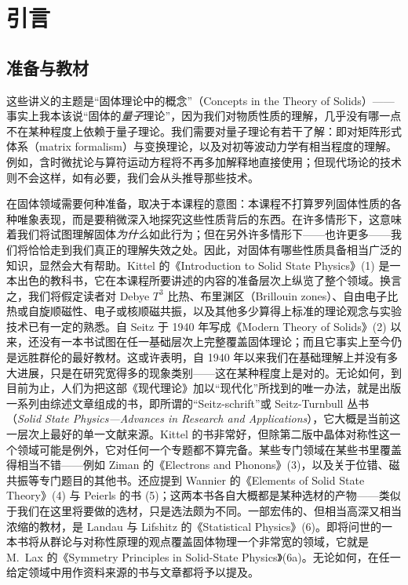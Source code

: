 \chapter{引言}

\section{准备与教材}

这些讲义的主题是“固体理论中的概念”（Concepts in the Theory of Solids）——事实上我本该说“固体的\emph{量子}理论”，因为我们对物质性质的理解，几乎没有哪一点不在某种程度上依赖于量子理论。我们需要对量子理论有若干了解：即对矩阵形式体系（matrix formalism）与变换理论，以及对初等波动力学有相当程度的理解。例如，含时微扰论与算符运动方程将不再多加解释地直接使用；但现代场论的技术则不会这样，如有必要，我们会从头推导那些技术。

在固体领域需要何种准备，取决于本课程的意图：本课程不打算罗列固体性质的各种唯象表现，而是要稍微深入地探究这些性质背后的东西。在许多情形下，这意味着我们将试图理解固体\emph{为什么}如此行为；但在另外许多情形下——也许更多——我们将恰恰走到我们真正的理解失效之处。因此，对固体有哪些性质具备相当广泛的知识，显然会大有帮助。Kittel 的《Introduction to Solid State Physics》(1) 是一本出色的教科书，它在本课程所要讲述的内容的准备层次上纵览了整个领域。换言之，我们将假定读者对 Debye $T^3$ 比热、布里渊区（Brillouin zones）、自由电子比热或自旋顺磁性、电子或核顺磁共振，以及其他多少算得上标准的理论观念与实验技术已有一定的熟悉。自 Seitz 于 1940 年写成《Modern Theory of Solids》(2) 以来，还没有一本书试图在任一基础层次上完整覆盖固体理论；而且它事实上至今仍是远胜群伦的最好教材。这或许表明，自 1940 年以来我们在基础理解上并没有多大进展，只是在研究宽得多的现象类别——这在某种程度上是对的。无论如何，到目前为止，人们为把这部《现代理论》加以“现代化”所找到的唯一办法，就是出版一系列由综述文章组成的书，即所谓的“Seitz-schrift”或 Seitz-Turnbull 丛书（\emph{Solid State Physics---Advances in Research and Applications}），它大概是当前这一层次上最好的单一文献来源。Kittel 的书非常好，但除第二版中晶体对称性这一个领域可能是例外，它对任何一个专题都不算完备。某些专门领域在某些书里覆盖得相当不错——例如 Ziman 的《Electrons and Phonons》(3)，以及关于位错、磁共振等专门题目的其他书。还应提到 Wannier 的《Elements of Solid State Theory》(4) 与 Peierls 的书 (5)；这两本书各自大概都是某种选材的产物——类似于我们在这里将要做的选材，只是选法颇为不同。一部宏伟的、但相当高深又相当浓缩的教材，是 Landau 与 Lifshitz 的《Statistical Physics》(6)。即将问世的一本书将从群论与对称性原理的观点覆盖固体物理一个非常宽的领域，它就是 M.~Lax 的《Symmetry Principles in Solid-State Physics》(6a)。无论如何，在任一给定领域中用作资料来源的书与文章都将予以提及。

